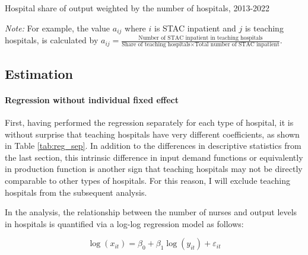 \documentclass[12pt]{article}
\begin{document}
\begin{table}\fontsize{10pt}{12pt}\selectfont
    \centering
    \begin{adjustbox}{width=\textwidth,center}
        \begin{threeparttable}[b]
            
            \caption{Hospital share of output weighted by the number of hospitals, 2013-2022}
            \label{tab:output}
            \begin{tablenotes}
                \footnotesize
                \textit{Note:} For example, the value $a_{ij}$ where $i$ is STAC inpatient and $j$ is teaching hospitals, is calculated by $a_{ij}= \frac{\text{Number of STAC inpatient  in teaching hospitals}}{\text{Share of teaching hospitals}\times \text{Total number of STAC inpatient}}$.
            \end{tablenotes}

        \end{threeparttable}
    \end{adjustbox}

\end{table}

\subsection{Estimation}

\paragraph{Regression without individual fixed effect}

First, having performed the regression separately for each type of hospital, it
is without surprise that teaching hospitals have very different coefficients,
as shown in Table \ref{tab:reg_sep}. In addition to the differences in
descriptive statistics from the last section, this intrinsic difference in
input demand functions or equivalently in production function is another sign
that teaching hospitals may not be directly comparable to other types of
hospitals. For this reason, I will exclude teaching hospitals from the
subsequent analysis.

In the analysis, the relationship between the number of nurses and output
levels in hospitals is quantified via a log-log regression model as follows:

\begin{equation}
    \log(x_{it}) = \beta_0 + \beta_1 \log(y_{it}) + \varepsilon_{it}
\end{equation}
\end{document}

